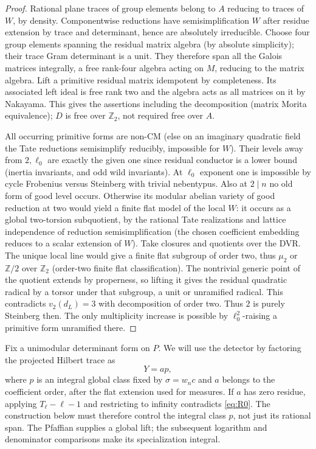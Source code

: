\begin{proof}
Rational plane traces of group elements belong to \(A\) reducing to traces of \(W\), by density. Componentwise reductions have semisimplification \(W\) after residue extension by trace and determinant, hence are absolutely irreducible. Choose four group elements spanning the residual matrix algebra (by absolute simplicity); their trace Gram determinant is a unit. They therefore span all the Galois matrices integrally, a free rank-four algebra acting on \(M\), reducing to the matrix algebra. Lift a primitive residual matrix idempotent by completeness. Its associated left ideal is free rank two and the algebra acts as all matrices on it by Nakayama. This gives the assertions including the decomposition (matrix Morita equivalence); \(D\) is free over \(\mathbb Z_2\), not required free over \(A\).

All occurring primitive forms are non-CM (else on an imaginary quadratic field the Tate reductions semisimplify reducibly, impossible for \(W\)). Their levels away from \(2,\ell_0\) are exactly the given one since residual conductor is a lower bound (inertia invariants, and odd wild invariants). At \(\ell_0\) exponent one is impossible by cycle Frobenius versus Steinberg with trivial nebentypus. Also at \(2\mid n\) no old form of good level occurs. Otherwise its modular abelian variety of good reduction at two would yield a finite flat model of the local \(W\): it occurs as a global two-torsion subquotient, by the rational Tate realizations and lattice independence of reduction semisimplification (the chosen coefficient embedding reduces to a scalar extension of \(W\)). Take closures and quotients over the DVR. The unique local line would give a finite flat subgroup of order two, thus \(\mu_2\) or \(\mathbb Z/2\) over \(\mathbb Z_2\) (order-two finite flat classification). The nontrivial generic point of the quotient extends by properness, so lifting it gives the residual quadratic radical by a torsor under that subgroup, a unit or unramified radical. This contradicts \(v_2(d_L)=3\) with decomposition of order two. Thus \(2\) is purely Steinberg then. The only multiplicity increase is possible by \(\ell_0^2\)-raising a primitive form unramified there.
\end{proof}

Fix a unimodular determinant form on \(P\). We will use the detector
by factoring the projected Hilbert trace as
\[
                         Y=a p,
\]
where \(p\) is an integral global class fixed by \(\sigma=w_nc\)
and \(a\) belongs to the coefficient order, after the flat extension
used for measures. If \(a\) has zero residue, applying
\(T_\ell-\ell-1\) and restricting to infinity contradicts
\eqref{eq:R0}. The construction below must therefore control the
integral class \(p\), not just its rational span. The Pfaffian
supplies a global lift; the subsequent logarithm and denominator
comparisons make its specialization integral.

